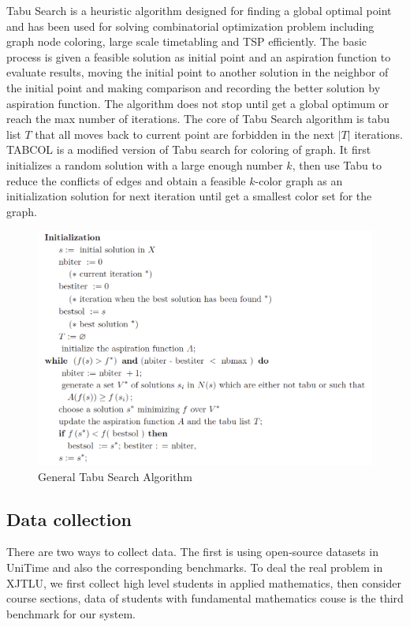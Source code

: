 \documentclass{article}
\begin{document}
Tabu Search is a heuristic algorithm designed for finding a global optimal point and has been used for solving combinatorial optimization problem including graph node coloring, large scale timetabling and TSP efficiently. The basic process is given a feasible solution as initial point and an aspiration function to evaluate results, moving the initial point to another solution in the neighbor of the initial point and making comparison and recording the better solution by aspiration function. The algorithm does not stop until get a global optimum or reach the max number of iterations. The core of Tabu Search algorithm is tabu list $T$ that all moves back to current point are forbidden in the next $|T|$ iterations. TABCOL\citep{(hertz1987)using} is a modified version of Tabu search for coloring of graph. It first initializes a random solution with a large enough number $k$, then use Tabu to reduce the conflicts of edges and obtain a feasible $k$-color graph as an initialization solution for next iteration until get a smallest color set for the graph.


\begin{figure}[h]
	\centering
	\includegraphics[width=0.8\linewidth]{fig3.png}
	\caption{General Tabu Search Algorithm \citep{(hertz1991)tabu}}
\end{figure}

\subsection{Data collection}

There are two ways to collect data. The first is using open-source datasets in UniTime and also the corresponding benchmarks. To deal the real problem in XJTLU, we first collect high level students in applied mathematics, then consider course sections, data of students with fundamental mathematics couse is the third benchmark for our system. 

\qquad

\newpage



\end{document}
